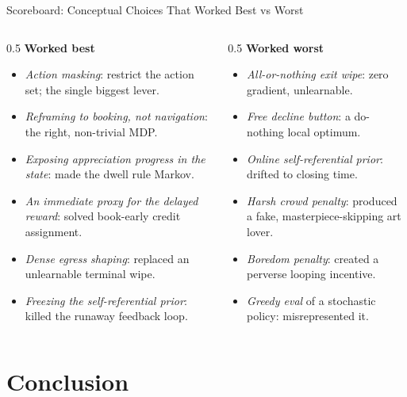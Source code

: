 \documentclass[aspectratio=169, 11pt]{beamer}
\newcommand{\thead}[1]{\textbf{#1}}
\newcommand{\good}[1]{\textcolor{safegreen}{#1}}
\newcommand{\bad}[1]{\textcolor{crowdred}{#1}}
\newcommand{\emp}[1]{\textit{#1}}
\begin{document}
\begin{frame}{Scoreboard: Conceptual Choices That Worked Best vs Worst}
\footnotesize
\begin{columns}[T]
\begin{column}{0.5\textwidth}
\thead{\good{Worked best}}
\begin{itemize}\setlength\itemsep{2pt}
\item \emp{Action masking}: restrict the action set; the single biggest lever.
\item \emp{Reframing to booking, not navigation}: the right, non-trivial MDP.
\item \emp{Exposing appreciation progress in the state}: made the dwell rule Markov.
\item \emp{An immediate proxy for the delayed reward}: solved book-early credit
      assignment.
\item \emp{Dense egress shaping}: replaced an unlearnable terminal wipe.
\item \emp{Freezing the self-referential prior}: killed the runaway feedback loop.
\end{itemize}
\end{column}
\begin{column}{0.5\textwidth}
\thead{\bad{Worked worst}}
\begin{itemize}\setlength\itemsep{2pt}
\item \emp{All-or-nothing exit wipe}: zero gradient, unlearnable.
\item \emp{Free decline button}: a do-nothing local optimum.
\item \emp{Online self-referential prior}: drifted to closing time.
\item \emp{Harsh crowd penalty}: produced a fake, masterpiece-skipping art lover.
\item \emp{Boredom penalty}: created a perverse looping incentive.
\item \emp{Greedy eval} of a stochastic policy: misrepresented it.
\end{itemize}
\end{column}
\end{columns}
\end{frame}

\section{Conclusion}
\end{document}
